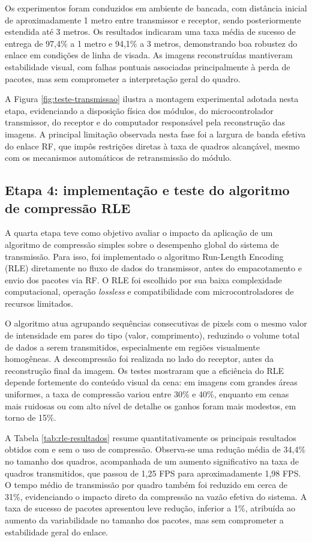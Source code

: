 \documentclass[repeatfields,xlists,xpacks,oneside]{ufrgscca}
\begin{document}
Os experimentos foram conduzidos em ambiente de bancada, com distância inicial de aproximadamente 1 metro entre transmissor e receptor, sendo posteriormente estendida até 3 metros. Os resultados indicaram uma taxa média de sucesso de entrega de 97,4\% a 1 metro e 94,1\% a 3 metros, demonstrando boa robustez do enlace em condições de linha de visada. As imagens reconstruídas mantiveram estabilidade visual, com falhas pontuais associadas principalmente à perda de pacotes, mas sem comprometer a interpretação geral do quadro.

A Figura \ref{fig:teste-transmissao} ilustra a montagem experimental adotada nesta etapa, evidenciando a disposição física dos módulos, do microcontrolador transmissor, do receptor e do computador responsável pela reconstrução das imagens. A principal limitação observada nesta fase foi a largura de banda efetiva do enlace RF, que impôs restrições diretas à taxa de quadros alcançável, mesmo com os mecanismos automáticos de retransmissão do módulo.

\subsection{Etapa 4: implementação e teste do algoritmo de compressão RLE}

A quarta etapa teve como objetivo avaliar o impacto da aplicação de um algoritmo de compressão simples sobre o desempenho global do sistema de transmissão. Para isso, foi implementado o algoritmo Run-Length Encoding (RLE) diretamente no fluxo de dados do transmissor, antes do empacotamento e envio dos pacotes via RF. O RLE foi escolhido por sua baixa complexidade computacional, operação \textit{lossless} e compatibilidade com microcontroladores de recursos limitados.

O algoritmo atua agrupando sequências consecutivas de pixels com o mesmo valor de intensidade em pares do tipo (valor, comprimento), reduzindo o volume total de dados a serem transmitidos, especialmente em regiões visualmente homogêneas. A descompressão foi realizada no lado do receptor, antes da reconstrução final da imagem. Os testes mostraram que a eficiência do RLE depende fortemente do conteúdo visual da cena: em imagens com grandes áreas uniformes, a taxa de compressão variou entre 30\% e 40\%, enquanto em cenas mais ruidosas ou com alto nível de detalhe os ganhos foram mais modestos, em torno de 15\%.

A Tabela \ref{tab:rle-resultados} resume quantitativamente os principais resultados obtidos com e sem o uso de compressão. Observa-se uma redução média de 34,4\% no tamanho dos quadros, acompanhada de um aumento significativo na taxa de quadros transmitidos, que passou de 1,25 FPS para aproximadamente 1,98 FPS. O tempo médio de transmissão por quadro também foi reduzido em cerca de 31\%, evidenciando o impacto direto da compressão na vazão efetiva do sistema. A taxa de sucesso de pacotes apresentou leve redução, inferior a 1\%, atribuída ao aumento da variabilidade no tamanho dos pacotes, mas sem comprometer a estabilidade geral do enlace.
\end{document}
